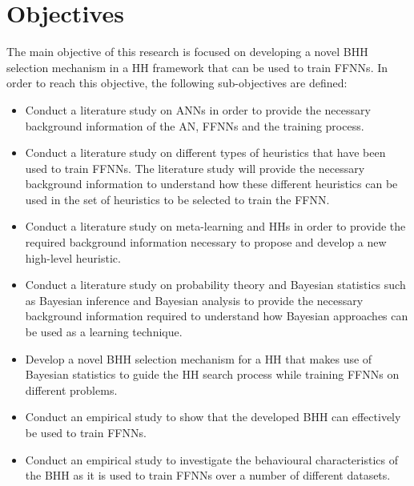 \section{Objectives}
\label{sec:introduction:objectives}

The main objective of this research is focused on developing a novel \Ac{BHH}
selection mechanism in a \ac{HH} framework that can be used to train \acp{FFNN}.
In order to reach this objective, the following sub-objectives are defined:

\begin{itemize}
      \item
            Conduct a literature study on \acp{ANN} in order to provide
            the necessary background information of the \ac{AN}, \acp{FFNN} and the
            training process.

      \item
            Conduct a literature study on different types of heuristics that have been
            used to train \acp{FFNN}. The literature study will provide the necessary
            background information to understand how these different heuristics can
            be used in the set of heuristics to be selected to train the \ac{FFNN}.

      \item
            Conduct a literature study on meta-learning and
            \acp{HH} in order to provide the required background information
            necessary to propose and develop a new high-level heuristic.

      \item
            Conduct a literature study on probability theory and Bayesian statistics
            such as Bayesian inference and Bayesian analysis to provide the necessary
            background information required to understand how Bayesian approaches can be
            used as a learning technique.

      \item
            Develop a novel \Ac{BHH} selection mechanism for a \ac{HH} that makes use
            of Bayesian statistics to guide the \ac{HH} search process while training
            \acp{FFNN} on different problems.

      \item
            Conduct an empirical study to show that the developed \Ac{BHH} can
            effectively be used to train \acp{FFNN}.

      \item Conduct an empirical study to investigate the behavioural characteristics of the \ac{BHH} as it is used to train \acp{FFNN} over a number of different datasets.


\end{itemize}
